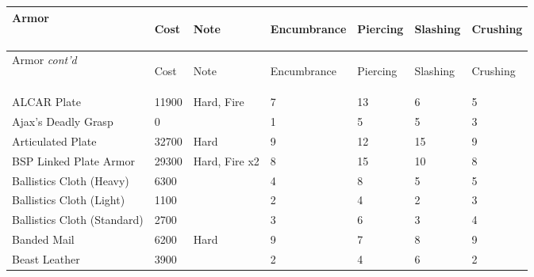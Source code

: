 \documentclass[twoside]{book}
\begin{document}
\begin{longtable}{p{1.25in}llp{2em}p{2em}p{2em}p{2em}} 
  Armor& \begin{turn}{70}{Cost}\end{turn}
          & \begin{turn}{70}{Note}\end{turn}
          & \begin{turn}{70}{Encumbrance}\end{turn}
          & \begin{turn}{70}{Piercing}\end{turn}
          & \begin{turn}{70}{Slashing}\end{turn}
          & \begin{turn}{70}{Crushing}\end{turn}
          \\
  \hline
  \hline
  \endfirsthead
  Armor \textit{cont'd}
        & \begin{turn}{70}{Cost}\end{turn}
          & \begin{turn}{70}{Note}\end{turn}
          & \begin{turn}{70}{Encumbrance}\end{turn}
          & \begin{turn}{70}{Piercing}\end{turn}
          & \begin{turn}{70}{Slashing}\end{turn}
          & \begin{turn}{70}{Crushing}\end{turn}
           \\
  \hline
  \endhead
\raggedright ALCAR Plate & 11900 & Hard, Fire & 7 & 13 & 6 & 5 \tabularnewline
      \raggedright Ajax's Deadly Grasp
           & 0 && 1 & 5 & 5 & 3 \tabularnewline
      \raggedright Articulated Plate & 32700 & Hard & 9 & 12 & 15 & 9 \tabularnewline
      \raggedright BSP Linked Plate Armor & 29300 & Hard, Fire x2 & 8 & 15 & 10 & 8 \tabularnewline
      \raggedright Ballistics Cloth (Heavy)
           & 6300 && 4 & 8 & 5 & 5 \tabularnewline
      \raggedright Ballistics Cloth (Light)
           & 1100 && 2 & 4 & 2 & 3 \tabularnewline
      \raggedright Ballistics Cloth (Standard)
           & 2700 && 3 & 6 & 3 & 4 \tabularnewline
      \raggedright Banded Mail & 6200 & Hard & 9 & 7 & 8 & 9 \tabularnewline
      \raggedright Beast Leather & 3900 && 2 & 4 & 6 & 2 \tabularnewline

\end{longtable}
\end{document}
